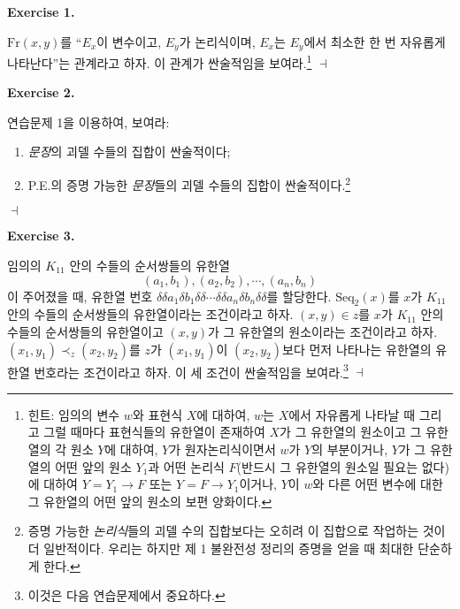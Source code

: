 \documentclass[12pt]{paper}
\newenvironment{context}[1][]
{ \noindent \textbf{{#1}.}
}
{ \hfill $ \dashv $ }
\begin{document}
\begin{context}[Exercise 1]
$\mathrm{Fr} \left( x , y \right)$를 ``$E_x$이 변수이고, $E_y$가 논리식이며, $E_x$는 $E_y$에서 최소한 한 번 자유롭게 나타난다''는 관계라고 하자.
이 관계가 싼술적임을 보여라.\footnote
{
힌트: 임의의 변수 $w$와 표현식 $X$에 대하여,
$w$는 $X$에서 자유롭게 나타날 때 그리고 그럴 때마다
표현식들의 유한열이 존재하여 $X$가 그 유한열의 원소이고 그 유한열의 각 원소 $Y$에 대하여,
$Y$가 원자논리식이면서 $w$가 $Y$의 부분이거나,
$Y$가 그 유한열의 어떤 앞의 원소 $Y_1$과 어떤 논리식 $F$(반드시 그 유한열의 원소일 필요는 없다)에 대하여 $Y = Y_1 \rightarrow F$ 또는 $Y = F \rightarrow Y_1$이거나,
$Y$이 $w$와 다른 어떤 변수에 대한 그 유한열의 어떤 앞의 원소의 보편 양화이다.
}
\end{context}

\begin{context}[Exercise 2]
연습문제 1을 이용하여, 보여라:
\begin{enumerate}
\item \textit{문장}의 괴델 수들의 집합이 싼술적이다;
\item P.E.의 증명 가능한 \textit{문장}들의 괴델 수들의 집합이 싼술적이다.\footnote
{
증명 가능한 \textit{논리식}들의 괴델 수의 집합보다는 오히려 이 집합으로 작업하는 것이 더 일반적이다.
우리는 하지만 제 1 불완전성 정리의 증명을 얻을 때 최대한 단순하게 한다.
}
\end{enumerate}
\end{context}

\begin{context}[Exercise 3]
임의의 $K_{11}$ 안의 수들의 순서쌍들의 유한열 $$\left( a_1 , b_1 \right) , \left( a_2 , b_2 \right) , \cdots , \left( a_n , b_n \right)$$이 주어졌을 때,
유한열 번호 $\delta \delta a_1 \delta b_1 \delta\delta \cdots \delta \delta a_n \delta b_n \delta \delta$를 할당한다.
$\mathrm{Seq}_2 \left( x \right)$를 $x$가 $K_{11}$ 안의 수들의 순서쌍들의 유한열이라는 조건이라고 하자.
$ \left( x , y \right) \in z $를 $x$가 $K_{11}$ 안의 수들의 순서쌍들의 유한열이고
$ \left( x , y \right) $가 그 유한열의 원소이라는 조건이라고 하자.
$ \left( x_1 , y_1 \right) \prec_{z} \left( x_2 , y_2 \right) $를
$z$가 $\left( x_1 , y_1 \right)$이 $\left( x_2 , y_2 \right)$보다
먼저 나타나는 유한열의 유한열 번호라는 조건이라고 하자.
이 세 조건이 싼술적임을 보여라.\footnote
{
이것은 다음 연습문제에서 중요하다.
}
\end{context}
\end{document}
